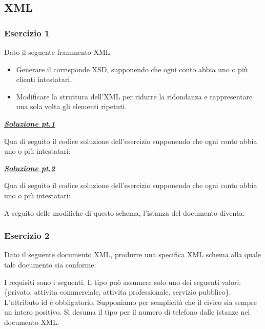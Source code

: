 \documentclass[a4paper]{article}
\begin{document}
	\subsection{XML}
	
	\subsubsection{Esercizio 1}
	
	Dato il seguente frammento XML:
	
	\begin{itemize}
		\item Generare il corrisponde XSD, supponendo che ogni conto abbia uno o più clienti intestatari.
		
		\item Modificare la struttura dell'XML per ridurre la ridondanza e rappresentare una sola volta gli elementi ripetuti.
	\end{itemize}\newpage
	
	\noindent
	\textcolor{Green4}{\underline{\textbf{\emph{Soluzione pt.1}}}}\newline
	
	\noindent
	Qua di seguito il codice soluzione dell'esercizio supponendo che ogni conto abbia uno o più intestatari:
	\newpage
	
	\noindent
	\textcolor{Green4}{\underline{\textbf{\emph{Soluzione pt.2}}}}\newline
	
	\noindent
	Qua di seguito il codice soluzione dell'esercizio supponendo che ogni conto abbia uno o più intestatari:
	
	A seguito delle modifiche di questo schema, l'istanza del documento diventa:
	\newpage
	
	\subsubsection{Esercizio 2}
	Dato il seguente documento XML, produrre una specifica XML schema alla quale tale documento sia conforme:
	
	I requisiti sono i seguenti. Il tipo può assumere solo uno dei seguenti valori: \{privato, attivita commerciale, attivita professionale, servizio pubblico\}. L'attributo \textsf{id} è obbligatorio. Supponiamo per semplicità che il civico sia sempre un intero positivo. Si desuma il tipo per il numero di telefono dalle istanze nel documento XML.\newpage
	
\end{document}
